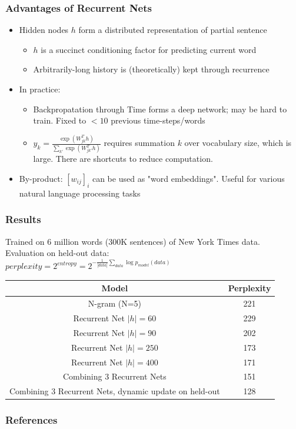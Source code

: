 \documentclass{beamer}
\newcommand{\bi}{\begin{itemize}}
\newcommand{\ei}{\end{itemize}}
\begin{document}
\begin{frame}
\frametitle{Advantages of Recurrent Nets}
\bi
\item Hidden nodes $h$ form a distributed representation of partial sentence
\bi
	\item $h$ is a succinct conditioning factor for predicting current word
	\item Arbitrarily-long history is (theoretically) kept through recurrence
\ei
\pause
\item In practice:
	\bi
	\item Backpropatation through Time forms a deep network; may be hard to train. Fixed to $<10$ previous time-steps/words 
	\item $y_k=\frac{\exp(W_{jk}^T h)}{\sum_{k'}\exp(W_{jk'}^T h)}$ requires summation $k$ over vocabulary size, which is large. There are shortcuts to reduce computation.
	\ei
\pause
\item By-product: $[w_{ij}]_i$ can be used as "word embeddings". Useful for various natural language processing tasks \cite{zhila13,turian10word} 
\ei
\end{frame}


\begin{frame}
\frametitle{Results \cite{mikolov10rnnlm}}

Trained on 6 million words (300K sentences) of New York Times data.\\[0.2cm] 
Evaluation on held-out data:\\ \hspace{1cm} $perplexity=2^{entropy} = 2^{- \frac{1}{|data|}\sum_{data} \log{p_{model}(data)}}$\\[1cm]

\begin{tabular}{|c|c|}
\hline
{\bf Model} & {\bf Perplexity} \\
\hline\hline
N-gram (N=5) & 221 \\
\hline
Recurrent Net $|h|=60$ & 229\\
Recurrent Net $|h|=90$ & 202\\
Recurrent Net $|h|=250$ & 173\\
Recurrent Net $|h|=400$ & 171\\
\hline
Combining 3 Recurrent Nets & 151 \\
Combining 3 Recurrent Nets, dynamic update on held-out & 128 \\
\hline
\end{tabular}
\end{frame}


\begin{frame}[allowframebreaks]
\frametitle{References}


\end{frame}
\end{document}
